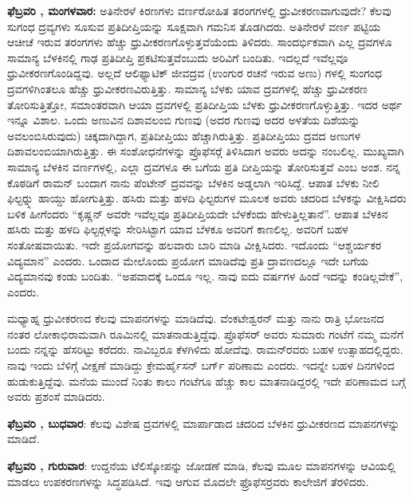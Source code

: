 \textbf{ಫೆಬ್ರವರಿ , ಮಂಗಳವಾರ:} ಅತಿನೇರಳೆ ಕಿರಣಗಳು ವರ್ಣರೋಹಿತ ತರಂಗಗಳಲ್ಲಿ ಧ್ರುವೀಕರಣವಾಗುವುದೇ? ಕೆಲವು ಸುಗಂಧ ದ್ರವ್ಯಗಳು ಸೂಸುವ ಪ್ರತಿದೀಪ್ತಿಯನ್ನು ಸೂಕ್ಷವಾಗಿ ಗಮನಿಸ ತೊಡಗಿದರು. ಅತಿನೇರಳೆ ವರ್ಣ ಪಟ್ಟಿಯ ಆಚೀಚೆ ಇರುವ ತರಂಗಗಳು ಹೆಚ್ಚು ಧ್ರುವೀಕರಣಗೊಳ್ಳುತ್ತವೆಯೆಂದು ತಿಳಿದರು. ಸಾಂದರ್ಭಿಕವಾಗಿ ಎಲ್ಲ ದ್ರವಗಳೂ ಸಾಮಾನ್ಯ ಬೆಳಕಿನಲ್ಲಿ ಗಾಢ ಪ್ರತಿದೀಪ್ತಿ ಪ್ರಕಟಿಸುತ್ತವೆಂಬುದು ಅರಿವಿಗೆ ಬಂದಿತು. ಇದಲ್ಲದೆ ಇವೆಲ್ಲವೂ ಧ್ರುವೀಕರಣಗೊಂಡಿದ್ದವು. ಅಲ್ಲದೆ ಆಲಿಫ್ಯಾಟಿಕ್ ಜೀವದ್ರವ (ಉಂಗುರ ರಚನೆ ಇರುವ ಅಣು) ಗಳಲ್ಲಿ ಸುಂಗಂಧ ದ್ರವಗಳಿಗಿಂತಲೂ ಹೆಚ್ಚು ಧ್ರುವೀಕರಣವಿರುತ್ತಿತ್ತು. ಸಾಮಾನ್ಯ ಬೆಳಕು ಯಾವ ದ್ರವಗಳಲ್ಲಿ ಹೆಚ್ಚು ಧ್ರುವೀಕರಣ ತೋರಿಸುತ್ತಿತ್ತೋ, ಸಮಾಂತರವಾಗಿ ಆಯಾ ದ್ರವಗಳಲ್ಲಿ ಪ್ರತಿದೀಪ್ತಿಯ ಬೆಳಕು ಧ್ರುವೀಕರಣಗೊಳ್ಳುತ್ತಿತ್ತು. ಇದರ ಅರ್ಥ ಇನ್ನೂ ವಿಶಾಲ. ಒಂದು ಅಣುವಿನ ದಿಶಾವಲಂಬಿ ಗುಣವು (ಅದರ ಗುಣವು ಅದರ ಅಳತೆಯ ದಿಶೆಯನ್ನು ಅವಲಂಬಿಸಿರುವುದು) ಚಿಕ್ಕದಾಗಿದ್ದಾಗ, ಪ್ರತಿದೀಪ್ತಿಯು ಹೆಚ್ಚಾಗಿರುತ್ತಿತ್ತು. ಪ್ರತಿದೀಪ್ತಿಯು ದ್ರವದ ಅಣುಗಳ ದಿಶಾವಲಂಬಿಯಾಗಿರುತ್ತಿತ್ತು. ಈ ಸಂಶೋಧನೆಗಳನ್ನು ಪ್ರೊಫೆಸರ್‍ಗೆ ತಿಳಿಸಿದಾಗ ಅವರು ಅದನ್ನು ನಂಬಲಿಲ್ಲ. ಮುಖ್ಯವಾಗಿ ಸಾಮಾನ್ಯ ಬೆಳಕಿನ ವರ್ಣಗಳಲ್ಲಿ, ಎಲ್ಲಾ ದ್ರವಗಳೂ ಈ ಬಗೆಯ ಪ್ರತಿ ದೀಪ್ತಿಯನ್ನು ತೋರಿಸುತ್ತವೆ ಎಂಬ ಅಂಶ. ನನ್ನ ಕೊಠಡಿಗೆ ರಾಮನ್ ಬಂದಾಗ ನಾನು ಪೆಂಟೇನ್ ದ್ರವವನ್ನು ಬೆಳಕಿನ ಅಡ್ಡಲಾಗಿ ಇರಿಸಿದ್ದೆ. ಆಪಾತ ಬೆಳಕು ನೀಲಿ ಫಿಲ್ಟರ್‍ನ್ನು ಹಾಯ್ದು ಹೋಗುತ್ತಿತ್ತು. ಹಸಿರು ಮತ್ತು ಹಳದಿ ಫಿಲ್ಟರುಗಳ ಮೂಲಕ ಅವರು ಚದರಿದ ಬೆಳಕನ್ನು ವೀಕ್ಷಿಸಿದರು ಬಳಿಕ ಹೀಗೆಂದರು\enginline{-} “ಕೃಷ್ಣನ್ ಅವರೇ ಇವೆಲ್ಲವೂ ಪ್ರತಿದೀಪ್ತಿಯದೇ ಬೆಳಕೆಂದು ಹೇಳುತ್ತಿಲ್ಲತಾನೆ”. ಆಪಾತ ಬೆಳಕಿನ ಹಸಿರು ಮತ್ತು ಹಳದಿ ಫಿಲ್ಟರ್‍ಗಳನ್ನು ಸೇರಿಸಿಟ್ಟಾಗ ಯಾವ ಬೆಳಕೂ ಅವರಿಗೆ ಕಾಣಲಿಲ್ಲ. ಅವರಿಗೆ ಬಹಳ ಸಂತೋಷವಾಯಿತು. ಇದೇ ಪ್ರಯೋಗವನ್ನು ಹಲವಾರು ಬಾರಿ ಮಾಡಿ ವೀಕ್ಷಿಸಿದರು. ಇದೊಂದು “ಆಶ್ಚರ್ಯಕರ ವಿದ್ಯಮಾನ” ಎಂದರು. ಒಂದಾದ ಮೇಲೊಂದು ಪ್ರಯೋಗ ಮಾಡಿದೆವು ಪ್ರತಿ ದ್ರಾವಣದಲ್ಲೂ ಇದೇ ಬಗೆಯ ವಿದ್ಯಮಾನವು ಕಂಡು ಬಂದಿತು. “ಅಪವಾದಕ್ಕೆ ಒಂದೂ ಇಲ್ಲ. ನಾವು ಐದು ವರ್ಷಗಳ ಹಿಂದೆ ಇದನ್ನು ಕಂಡಿಲ್ಲವೇಕೆ”, ಎಂದರು.

\vskip 1pt

ಮಧ್ಯಾಹ್ನ ಧ್ರುವೀಕರಣದ ಕೆಲವು ಮಾಪನಗಳನ್ನು ಮಾಡಿದೆವು. ವೆಂಕಟೇಶ್ವರನ್ ಮತ್ತು ನಾನು ರಾತ್ರಿ ಭೋಜನದ ನಂತರ ಲೋಕಾಭಿರಾಮವಾಗಿ ರೂಮಿನಲ್ಲಿ ಮಾತನಾಡುತ್ತಿದ್ದೆವು. ಪ್ರೊಫೆಸರ್ ಅವರು ಸುಮಾರು  ಗಂಟೆಗೆ ನಮ್ಮ ಮನೆಗೆ ಬಂದು ನನ್ನನ್ನು ಹೆಸರಿಟ್ಟು ಕರೆದರು. ನಾವಿಬ್ಬರೂ ಕೆಳಗಿಳಿದು ಹೋದೆವು. ರಾಮನ್‍ರವರು ಬಹಳ ಉತ್ಸಾಹದಲ್ಲಿದ್ದರು. ನಾವು ಇಂದು ಬೆಳಿಗ್ಗೆ ವೀಕ್ಷಣೆ ಮಾಡಿದ್ದು ಕ್ರೇಮರ್\enginline{-}ಹೈಸನ್ ಬರ್ಗ್ ಪರಿಣಾಮ ಎಂದರು. ಇದನ್ನೇ ಬಹಳ ದಿನಗಳಿಂದ ಹುಡುಕುತ್ತಿದ್ದೆವು. ಮನೆಯ ಮುಂದೆ ನಿಂತು ಕಾಲು ಗಂಟೆಗೂ ಹೆಚ್ಚು ಕಾಲ ಮಾತನಾಡಿದ್ದರಲ್ಲಿ ಇದೇ ಪರಿಣಾಮದ ಬಗ್ಗೆ ಅವರು ಪ್ರಶಂಸೆ ಮಾಡಿದರು.

\vskip 1pt

\textbf{ಫೆಬ್ರವರಿ , ಬುಧವಾರ}: ಕೆಲವು ವಿಶೇಷ ದ್ರವಗಳಲ್ಲಿ ಮಾರ್ಪಾಡಾದ ಚದರಿದ ಬೆಳಕಿನ ಧ್ರುವೀಕರಣದ ಮಾಪನಗಳನ್ನು ಮಾಡಿದೆ.

\vskip 1pt

\textbf{ಫೆಬ್ರವರಿ , ಗುರುವಾರ}: ಉದ್ದನೆಯ ಟೆಲಿಸ್ಕೋಪನ್ನು ಜೋಡಣೆ ಮಾಡಿ, ಕೆಲವು ಮೂಲ ಮಾಪನಗಳನ್ನು ಆವಿಯಲ್ಲಿ ಮಾಡಲು ಉಪಕರಣಗಳನ್ನು ಸಿದ್ಧಪಡಿಸಿದೆ. ಇವು ಆಗುವ ಮೊದಲೇ ಫ್ರೊಫೆಸರ್‍ರವರು ಕಾಲೇಜಿಗೆ ತೆರಳಿದರು.

